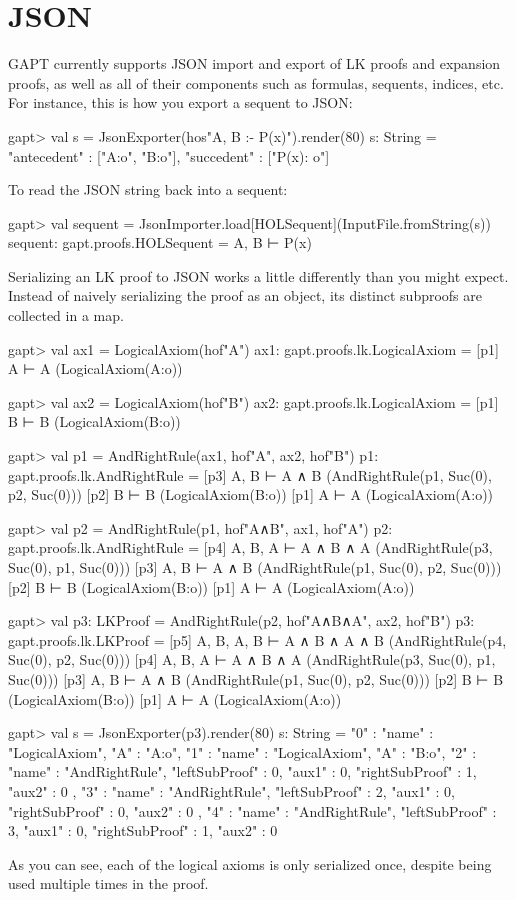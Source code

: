 \documentclass[a4paper,11pt]{book}
\begin{document}
\section{JSON}
GAPT currently supports JSON import and export of LK proofs and expansion proofs,
as well as all of their components such as formulas, sequents, indices, etc. For
instance, this is how you export a sequent to JSON:
\begin{clilisting}
gapt> val s = JsonExporter(hos"A, B :- P(x)").render(80)
s: String = {"antecedent" : ["A:o", "B:o"], "succedent" : ["P(x): o"]}

\end{clilisting}
To read the JSON string back into a sequent:
\begin{clilisting}
gapt> val sequent = JsonImporter.load[HOLSequent](InputFile.fromString(s))
sequent: gapt.proofs.HOLSequent = A, B ⊢ P(x)

\end{clilisting}
Serializing an LK proof to JSON works a little differently than you might
expect. Instead of naively serializing the proof as an object, its distinct
subproofs are collected in a map.
\begin{clilisting}
gapt> val ax1 = LogicalAxiom(hof"A")
ax1: gapt.proofs.lk.LogicalAxiom =
[p1] A ⊢ A    (LogicalAxiom(A:o))

gapt> val ax2 = LogicalAxiom(hof"B")
ax2: gapt.proofs.lk.LogicalAxiom =
[p1] B ⊢ B    (LogicalAxiom(B:o))

gapt> val p1 = AndRightRule(ax1, hof"A", ax2, hof"B")
p1: gapt.proofs.lk.AndRightRule =
[p3] A, B ⊢ A ∧ B    (AndRightRule(p1, Suc(0), p2, Suc(0)))
[p2] B ⊢ B    (LogicalAxiom(B:o))
[p1] A ⊢ A    (LogicalAxiom(A:o))

gapt> val p2 = AndRightRule(p1, hof"A∧B", ax1, hof"A")
p2: gapt.proofs.lk.AndRightRule =
[p4] A, B, A ⊢ A ∧ B ∧ A    (AndRightRule(p3, Suc(0), p1, Suc(0)))
[p3] A, B ⊢ A ∧ B    (AndRightRule(p1, Suc(0), p2, Suc(0)))
[p2] B ⊢ B    (LogicalAxiom(B:o))
[p1] A ⊢ A    (LogicalAxiom(A:o))

gapt> val p3: LKProof = AndRightRule(p2, hof"A∧B∧A", ax2, hof"B")
p3: gapt.proofs.lk.LKProof =
[p5] A, B, A, B ⊢ A ∧ B ∧ A ∧ B    (AndRightRule(p4, Suc(0), p2, Suc(0)))
[p4] A, B, A ⊢ A ∧ B ∧ A    (AndRightRule(p3, Suc(0), p1, Suc(0)))
[p3] A, B ⊢ A ∧ B    (AndRightRule(p1, Suc(0), p2, Suc(0)))
[p2] B ⊢ B    (LogicalAxiom(B:o))
[p1] A ⊢ A    (LogicalAxiom(A:o))

gapt> val s = JsonExporter(p3).render(80)
s: String =
{
  "0" : {"name" : "LogicalAxiom", "A" : "A:o"},
  "1" : {"name" : "LogicalAxiom", "A" : "B:o"},
  "2" : {
    "name" : "AndRightRule",
    "leftSubProof" : 0,
    "aux1" : 0,
    "rightSubProof" : 1,
    "aux2" : 0
  },
  "3" : {
    "name" : "AndRightRule",
    "leftSubProof" : 2,
    "aux1" : 0,
    "rightSubProof" : 0,
    "aux2" : 0
  },
  "4" : {
    "name" : "AndRightRule",
    "leftSubProof" : 3,
    "aux1" : 0,
    "rightSubProof" : 1,
    "aux2" : 0
  }
}

\end{clilisting}
As you can see, each of the logical axioms is only serialized once, despite being
used multiple times in the proof.
\end{document}
